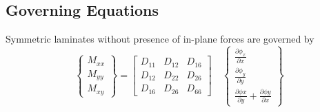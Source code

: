 \documentclass[11pt,letterpaper,titlepage,draft]{article}
\newcommand{\PDer}[2]{\frac{\partial #1}{\partial #2}}
\numberwithin{equation}{subsection}
\begin{document}
\subsection{Governing Equations}
Symmetric laminates without presence of in-plane forces are governed by
\begin{equation}\label{sym_lam_moment_angle}
    \begin{Bmatrix}
    M_{xx} \\
    M_{yy} \\
    M_{xy}
    \end{Bmatrix}
     = 
    \begin{bmatrix}
    D_{11} & D_{12} & D_{16} \\[3pt]
    D_{12} & D_{22} & D_{26} \\[3pt]
    D_{16} & D_{26} & D_{66}
    \end{bmatrix}
    \quad
    \begin{Bmatrix}
    \PDer{\phi_x}{x} \\[3pt]
    \PDer{\phi_y}{y} \\[3pt]
    \PDer{\phi x}{y} + \PDer{\phi y}{x}
    \end{Bmatrix}
\end{equation}
\end{document}
